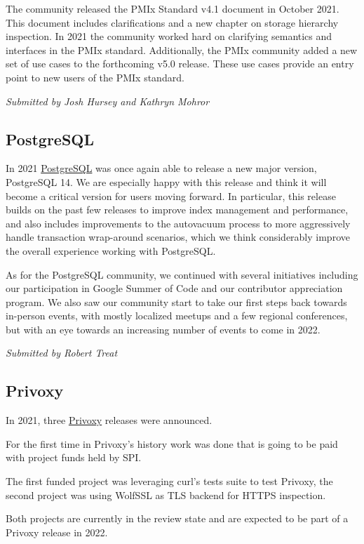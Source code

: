 \documentclass[a4paper]{report}
\begin{document}
The community released the PMIx Standard v4.1 document in October 2021. This document includes clarifications and a new chapter on storage hierarchy inspection. In 2021 the community worked hard on clarifying semantics and interfaces in the PMIx standard.  Additionally, the PMIx community added a new set of use cases to the forthcoming v5.0 release. These use cases provide an entry point to new users of the PMIx standard.

{\em Submitted by Josh Hursey and Kathryn Mohror}

\subsection{PostgreSQL}

In 2021 \href{https://www.postgresql.org/}{PostgreSQL} was once again able to release a new major version, PostgreSQL 14. We are especially happy with this release and think it will become a critical version for users moving forward. In particular, this release builds on the past few releases to improve index management and performance, and also includes improvements to the autovacuum process to more aggressively handle transaction wrap-around scenarios, which we think considerably improve the overall experience working with PostgreSQL.

As for the PostgreSQL community, we continued with several initiatives including our participation in Google Summer of Code and our contributor appreciation program. We also saw our community start to take our first steps back towards in-person events, with mostly localized meetups and a few regional conferences, but with an eye towards an increasing number of events to come in 2022.

{\em Submitted by Robert Treat}

\subsection{Privoxy}

In 2021, three \href{https://www.privoxy.org/}{Privoxy} releases were announced.

For the first time in Privoxy's history work was done that is going to be paid with project funds held by SPI.

The first funded project was leveraging curl's tests suite to test Privoxy, the second project was using WolfSSL as TLS backend for HTTPS inspection.

Both projects are currently in the review state and are expected to be part of a Privoxy release in 2022.
\end{document}
